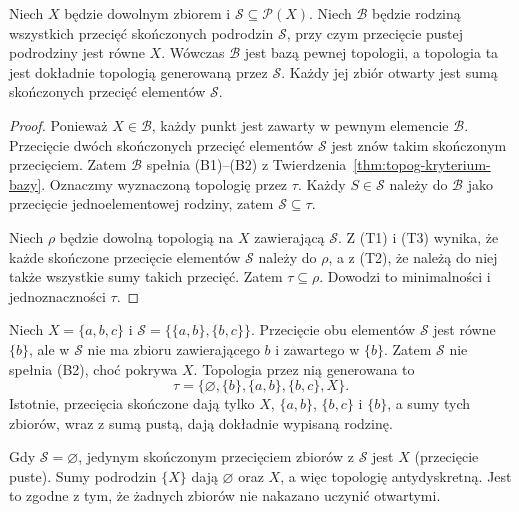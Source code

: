 \begin{twierdzenie}
\label{thm:topog-podbaza-konstrukcja}
Niech $X$ będzie dowolnym zbiorem i
$\mathcal S\subseteq\mathcal P(X)$. Niech $\mathcal B$
będzie rodziną wszystkich przecięć skończonych podrodzin
$\mathcal S$, przy czym przecięcie pustej podrodziny
jest równe $X$. Wówczas $\mathcal B$ jest bazą pewnej
topologii, a topologia ta jest dokładnie topologią
generowaną przez $\mathcal S$. Każdy jej zbiór otwarty
jest sumą skończonych przecięć elementów $\mathcal S$.
\end{twierdzenie}
\begin{proof}
Ponieważ $X\in\mathcal B$, każdy punkt jest zawarty
w pewnym elemencie $\mathcal B$. Przecięcie dwóch
skończonych przecięć elementów $\mathcal S$ jest
znów takim skończonym przecięciem. Zatem $\mathcal B$
spełnia (B1)--(B2) z
Twierdzenia~\ref{thm:topog-kryterium-bazy}.
Oznaczmy wyznaczoną topologię przez $\tau$.
Każdy $S\in\mathcal S$ należy do $\mathcal B$ jako
przecięcie jednoelementowej rodziny, zatem $\mathcal S
\subseteq\tau$.

Niech $\rho$ będzie dowolną topologią na $X$
zawierającą $\mathcal S$. Z (T1) i (T3) wynika,
że każde skończone przecięcie elementów $\mathcal S$
należy do $\rho$, a z (T2), że należą do niej także
wszystkie sumy takich przecięć. Zatem $\tau\subseteq\rho$.
Dowodzi to minimalności i jednoznaczności $\tau$.
\end{proof}

\begin{przyklad}
\label{ex:topog-podbaza-niebaza}
Niech $X=\{a,b,c\}$ i
$\mathcal S=\{\{a,b\},\{b,c\}\}$.
Przecięcie obu elementów $\mathcal S$ jest równe
$\{b\}$, ale w $\mathcal S$ nie ma zbioru
zawierającego $b$ i zawartego w $\{b\}$.
Zatem $\mathcal S$ nie spełnia (B2), choć pokrywa $X$.
Topologia przez nią generowana to
\[
\tau=\{\varnothing,\{b\},\{a,b\},\{b,c\},X\}.
\]
Istotnie, przecięcia skończone dają tylko $X$,
$\{a,b\}$, $\{b,c\}$ i $\{b\}$,
a sumy tych zbiorów, wraz z sumą pustą,
dają dokładnie wypisaną rodzinę.
\end{przyklad}

\begin{przyklad}
\label{ex:topog-pusta-podbaza}
Gdy $\mathcal S=\varnothing$, jedynym skończonym
przecięciem zbiorów z $\mathcal S$ jest $X$
(przecięcie puste). Sumy podrodzin $\{X\}$
dają $\varnothing$ oraz $X$, a więc topologię
antydyskretną. Jest to zgodne z tym, że żadnych
zbiorów nie nakazano uczynić otwartymi.
\end{przyklad}

